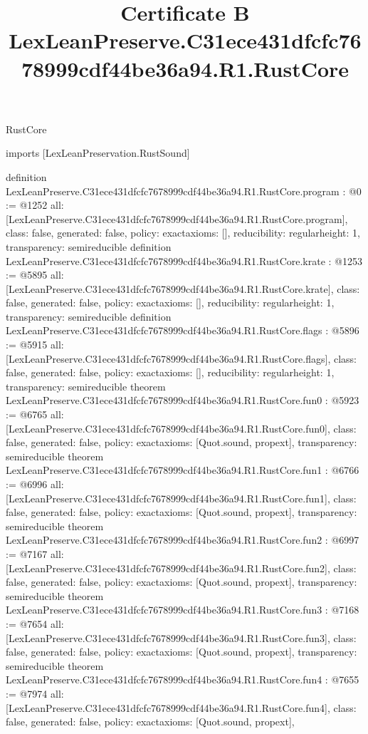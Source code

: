 \begin{lexlean}{RustCore}
\title{Certificate B LexLeanPreserve.C31ece431dfcfc7678999cdf44be36a94.R1.RustCore}
\begin{coremodule}
imports [LexLeanPreservation.RustSound]

definition LexLeanPreserve.C31ece431dfcfc7678999cdf44be36a94.R1.RustCore.program : @0 := @1252 {
  all: [LexLeanPreserve.C31ece431dfcfc7678999cdf44be36a94.R1.RustCore.program],
  class: false,
  generated: false,
  policy: exact{axioms: []},
  reducibility: regular{height: 1},
  transparency: semireducible
}
definition LexLeanPreserve.C31ece431dfcfc7678999cdf44be36a94.R1.RustCore.krate : @1253 := @5895 {
  all: [LexLeanPreserve.C31ece431dfcfc7678999cdf44be36a94.R1.RustCore.krate],
  class: false,
  generated: false,
  policy: exact{axioms: []},
  reducibility: regular{height: 1},
  transparency: semireducible
}
definition LexLeanPreserve.C31ece431dfcfc7678999cdf44be36a94.R1.RustCore.flags : @5896 := @5915 {
  all: [LexLeanPreserve.C31ece431dfcfc7678999cdf44be36a94.R1.RustCore.flags],
  class: false,
  generated: false,
  policy: exact{axioms: []},
  reducibility: regular{height: 1},
  transparency: semireducible
}
theorem LexLeanPreserve.C31ece431dfcfc7678999cdf44be36a94.R1.RustCore.fun0 : @5923 := @6765 {
  all: [LexLeanPreserve.C31ece431dfcfc7678999cdf44be36a94.R1.RustCore.fun0],
  class: false,
  generated: false,
  policy: exact{axioms: [Quot.sound, propext]},
  transparency: semireducible
}
theorem LexLeanPreserve.C31ece431dfcfc7678999cdf44be36a94.R1.RustCore.fun1 : @6766 := @6996 {
  all: [LexLeanPreserve.C31ece431dfcfc7678999cdf44be36a94.R1.RustCore.fun1],
  class: false,
  generated: false,
  policy: exact{axioms: [Quot.sound, propext]},
  transparency: semireducible
}
theorem LexLeanPreserve.C31ece431dfcfc7678999cdf44be36a94.R1.RustCore.fun2 : @6997 := @7167 {
  all: [LexLeanPreserve.C31ece431dfcfc7678999cdf44be36a94.R1.RustCore.fun2],
  class: false,
  generated: false,
  policy: exact{axioms: [Quot.sound, propext]},
  transparency: semireducible
}
theorem LexLeanPreserve.C31ece431dfcfc7678999cdf44be36a94.R1.RustCore.fun3 : @7168 := @7654 {
  all: [LexLeanPreserve.C31ece431dfcfc7678999cdf44be36a94.R1.RustCore.fun3],
  class: false,
  generated: false,
  policy: exact{axioms: [Quot.sound, propext]},
  transparency: semireducible
}
theorem LexLeanPreserve.C31ece431dfcfc7678999cdf44be36a94.R1.RustCore.fun4 : @7655 := @7974 {
  all: [LexLeanPreserve.C31ece431dfcfc7678999cdf44be36a94.R1.RustCore.fun4],
  class: false,
  generated: false,
  policy: exact{axioms: [Quot.sound, propext]},
}
\end{coremodule}
\end{lexlean}
